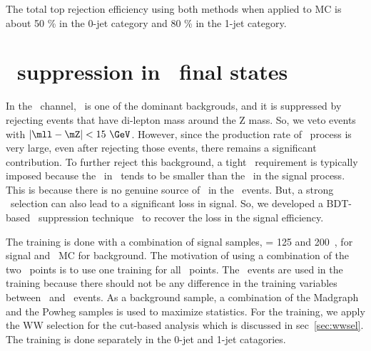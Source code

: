 The total top rejection efficiency using both methods when applied to \topbkg{} MC 
is about 50 \% in the 0-jet category and 80 \% in the 1-jet category. 


\section{\dyll\ suppression in \SF\ final states} 
\label{sec:dybkg}
In the \SF\ channel, \dyll\ is one of the dominant backgrouds, 
and it is suppressed by rejecting events that have 
di-lepton mass around the Z mass. So, we veto events with 
$\left|\mll - \mZ \right| < 15~\GeV$. However, since the 
production rate of \dyll\ process is very large, even after
rejecting those events, there remains a significant contribution. 
To further reject this background, a tight \met\ requirement is typically imposed
because the \met\ in \dyll\ tends to be smaller than 
the \met\ in the signal process. 
This is because there is no genuine source of \met\ in the \dyll\ events. 
But, a strong \met\ selection can also lead to a significant loss in signal. 
So, we developed a BDT-based \dyll\ suppression technique~\cite{dymva} to recover the 
loss in the signal efficiency. 

The training is done with a combination of signal samples, \mHi = 125 and 200~\GeV, 
for signal and \dyll\ MC for background. The motivation of using a combination of the two 
\mHi\ points is to use one training for all \mHi\ points. The \DF\ events 
are used in the training because there should not be any difference in the training 
variables between \SF\ and \DF\ events. 
As a background sample, 
a combination of the Madgraph and the Powheg samples is used to maximize statistics. 
For the training, we apply the WW selection for the cut-based analysis
which is discussed in sec~\ref{sec:wwsel}.
The training is done separately in the 0-jet and 1-jet catagories. 

